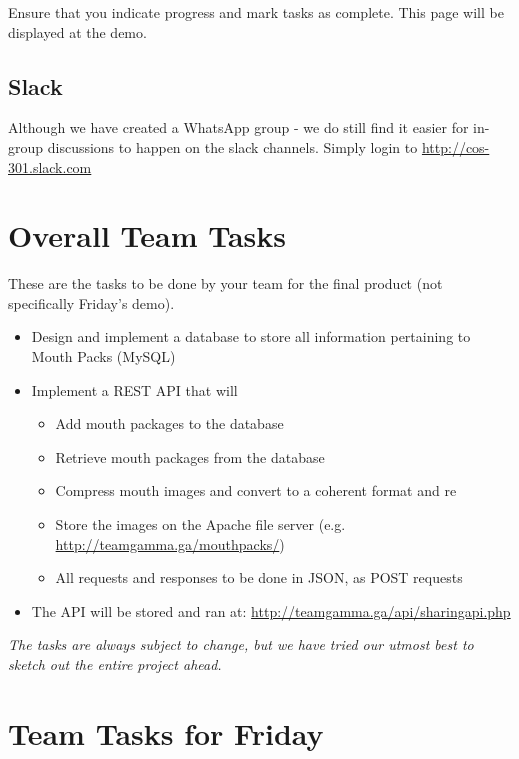\documentclass{article}
\begin{document}
Ensure that you indicate progress and mark tasks as complete. This page will be displayed at the demo.

\subsection{Slack}
Although we have created a WhatsApp group - we do still find it easier for in-group discussions to happen on the slack channels. Simply login to \url{http://cos-301.slack.com}

\newpage

\section{Overall Team Tasks}
These are the tasks to be done by your team for the final product (not specifically Friday's demo).

\begin{itemize}
    \item Design and implement a database to store all information pertaining to Mouth Packs (MySQL)
    \item Implement a REST API that will
    \begin{itemize}
        \item Add mouth packages to the database
        \item Retrieve mouth packages from the database
        \item Compress mouth images and convert to a coherent format and re \item Store the images on the Apache file server (e.g.  \url{http://teamgamma.ga/mouthpacks/})
        \item All requests and responses to be done in JSON, as POST requests
    \end{itemize}
    \item The API will be stored and ran at: \url{http://teamgamma.ga/api/sharingapi.php}
\end{itemize}

\vspace{1cm}

\begin{center}
   \textit{The tasks are always subject to change, but we have tried our utmost best to sketch out the entire project ahead.}
\end{center}

\newpage


\section{Team Tasks for Friday}
\end{document}
